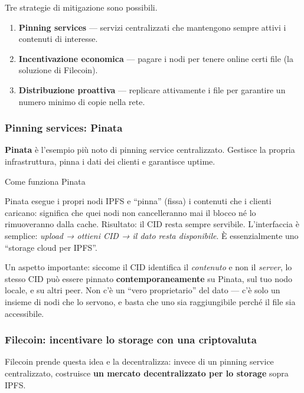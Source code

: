 \documentclass[
  italian,
  openany]{book}
\providecommand{\tightlist}{%
  \setlength{\itemsep}{0pt}\setlength{\parskip}{0pt}}
\begin{document}
Tre strategie di mitigazione sono possibili.

\begin{enumerate}
\def\labelenumi{\arabic{enumi}.}
\tightlist
\item
  \textbf{Pinning services} --- servizi centralizzati che mantengono
  sempre attivi i contenuti di interesse.
\item
  \textbf{Incentivazione economica} --- pagare i nodi per tenere online
  certi file (la soluzione di Filecoin).
\item
  \textbf{Distribuzione proattiva} --- replicare attivamente i file per
  garantire un numero minimo di copie nella rete.
\end{enumerate}

\subsubsection{Pinning services: Pinata}\label{pinning-services-pinata}

\textbf{Pinata} è l'esempio più noto di pinning service centralizzato.
Gestisce la propria infrastruttura, pinna i dati dei clienti e
garantisce uptime.

\begin{calloutnote}{Come funziona Pinata}

Pinata esegue i propri nodi IPFS e ``pinna'' (fissa) i contenuti che i
clienti caricano: significa che quei nodi non cancelleranno mai il
blocco né lo rimuoveranno dalla cache. Risultato: il CID resta sempre
servibile. L'interfaccia è semplice: \emph{upload → ottieni CID → il
dato resta disponibile}. È essenzialmente uno ``storage cloud per
IPFS''.

\end{calloutnote}

Un aspetto importante: siccome il CID identifica il \emph{contenuto} e
non il \emph{server}, lo stesso CID può essere pinnato
\textbf{contemporaneamente} su Pinata, sul tuo nodo locale, e su altri
peer. Non c'è un ``vero proprietario'' del dato --- c'è solo un insieme
di nodi che lo servono, e basta che uno sia raggiungibile perché il file
sia accessibile.

\subsubsection{Filecoin: incentivare lo storage con una
criptovaluta}\label{filecoin-incentivare-lo-storage-con-una-criptovaluta}

Filecoin prende questa idea e la decentralizza: invece di un pinning
service centralizzato, costruisce \textbf{un mercato decentralizzato per
lo storage} sopra IPFS.
\end{document}
